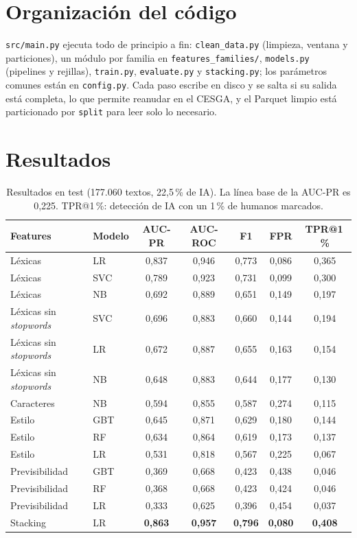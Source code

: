 \documentclass[runningheads]{llncs}
\begin{document}
\section{Organización del código}

\texttt{src/main.py} ejecuta todo de principio a fin: \texttt{clean\_data.py} (limpieza,
ventana y particiones), un módulo por familia en \texttt{features\_families/},
\texttt{models.py} (pipelines y rejillas), \texttt{train.py}, \texttt{evaluate.py} y
\texttt{stacking.py}; los parámetros comunes están en \texttt{config.py}. Cada paso escribe en
disco y se salta si su salida está completa, lo que permite reanudar en el CESGA, y el Parquet
limpio está particionado por \texttt{split} para leer solo lo necesario.

\section{Resultados}

\begin{table}
\centering
\caption{Resultados en test (177.060 textos, 22,5\,\% de IA). La línea base de la AUC-PR es
0,225. TPR@1\,\%: detección de IA con un 1\,\% de humanos marcados.}
\label{tab:resultados}
\begin{tabular}{llccccc}
\toprule
Features & Modelo & AUC-PR & AUC-ROC & F1 & FPR & TPR@1\,\% \\
\midrule
Léxicas & LR & 0,837 & 0,946 & 0,773 & 0,086 & 0,365 \\
Léxicas & SVC & 0,789 & 0,923 & 0,731 & 0,099 & 0,300 \\
Léxicas & NB & 0,692 & 0,889 & 0,651 & 0,149 & 0,197 \\
Léxicas sin \emph{stopwords} & SVC & 0,696 & 0,883 & 0,660 & 0,144 & 0,194 \\
Léxicas sin \emph{stopwords} & LR & 0,672 & 0,887 & 0,655 & 0,163 & 0,154 \\
Léxicas sin \emph{stopwords} & NB & 0,648 & 0,883 & 0,644 & 0,177 & 0,130 \\
Caracteres & NB & 0,594 & 0,855 & 0,587 & 0,274 & 0,115 \\
Estilo & GBT & 0,645 & 0,871 & 0,629 & 0,180 & 0,144 \\
Estilo & RF & 0,634 & 0,864 & 0,619 & 0,173 & 0,137 \\
Estilo & LR & 0,531 & 0,818 & 0,567 & 0,225 & 0,067 \\
Previsibilidad & GBT & 0,369 & 0,668 & 0,423 & 0,438 & 0,046 \\
Previsibilidad & RF & 0,368 & 0,668 & 0,423 & 0,424 & 0,046 \\
Previsibilidad & LR & 0,333 & 0,625 & 0,396 & 0,454 & 0,037 \\
\midrule
Stacking & LR & \textbf{0,863} & \textbf{0,957} & \textbf{0,796} & \textbf{0,080} & \textbf{0,408} \\
\bottomrule
\end{tabular}
\end{table}
\end{document}
